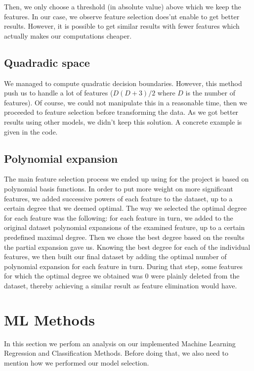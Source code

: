 \documentclass[10pt,conference,compsocconf]{IEEEtran}
\begin{document}
Then, we only choose a threshold (in absolute value) above which we keep the features. In our case, we observe feature selection does’nt enable to get better results. However, it is possible to get similar results with fewer features which actually makes our computations cheaper.
\subsection{Quadradic space}
We managed to compute quadratic decision boundaries. However, this method push us to handle a lot of features ($D(D+3)/2$ where $D$ is the number of features). Of course, we could not manipulate this in a reasonable time, then we proceeded to feature selection before transforming the data.
As we got better results using other models, we didn’t keep this solution. A concrete example is given in the code.
\subsection{Polynomial expansion}
The main feature selection process we ended up using for the project is based on polynomial basis functions. In order to put more weight on more significant features, we added successive powers of each feature to the dataset, up to a certain degree that we deemed optimal.
The way we selected the optimal degree for each feature was the following: for each feature in turn, we added to the original dataset polynomial expansions of the examined feature, up to a certain predefined maximal degree. Then we chose the best degree based on the results the partial expansion gave us.
Knowing the best degree for each of the individual features, we then built our final dataset by adding the optimal number of polynomial expansion for each feature in turn. During that step, some features for which the optimal degree we obtained was 0 were plainly deleted from the dataset, thereby achieving a similar result as feature elimination would have.

\section{ML Methods}
In this section we perfom an analysis on our implemented Machine Learning Regression and Classification Methods. Before doing that, we also need to mention how we performed our model selection.
\end{document}
